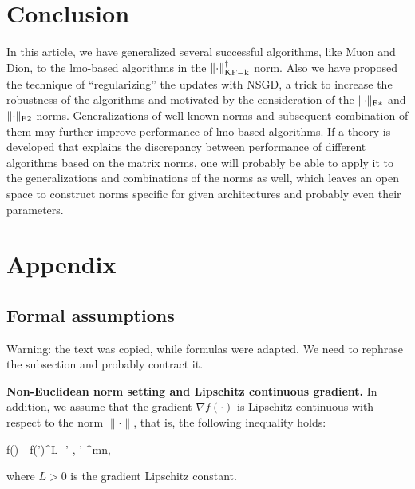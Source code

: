 \documentclass{article} %
\newcommand{\norm}[1]{\lVert #1\rVert}
\newcommand{\Rmn}{\R^{m\times n}}
\DeclarePairedDelimiter{\normkfk}{\|}{\|_\mathrm{KF-k}}
\DeclarePairedDelimiter{\normfstar}{\|}{\|_\mathrm{F*}}
\DeclarePairedDelimiter{\normftwo}{\|}{\|_\mathrm{F2}}
\newcounter{aequation}
\begin{document}
\section{Conclusion}
In this article, we have generalized several successful algorithms, like Muon and Dion, to the lmo-based algorithms in the $\normkfk{\cdot}^\dagger$ norm. Also we have proposed the technique of ``regularizing'' the updates with NSGD, a trick to increase the robustness of the algorithms and motivated by the consideration of the $\normfstar{\cdot}$ and $\normftwo{\cdot}$ norms. Generalizations of well-known norms and subsequent combination of them may further improve performance of lmo-based algorithms. If a theory is developed that explains the discrepancy between performance of different algorithms based on the matrix norms, one will probably be able to apply it to the generalizations and combinations of the norms as well, which leaves an open space to construct norms specific for given architectures and probably even their parameters.




\section{Appendix}
\subsection{Formal assumptions}
Warning: the text was copied, while formulas were adapted. We need to rephrase the subsection and probably contract it.


{\bf Non-Euclidean norm setting and Lipschitz continuous gradient.}
    In addition, we assume that the gradient $\nabla f(\cdot)$ is Lipschitz continuous with respect to the norm $\norm{\cdot}$, that is, the following inequality holds:
    \begin{aequation}\label{eq:L}
    \norm{\nabla f(\mX) - \nabla f(\mX')}^\dagger \leq L \norm{\mX-\mX'}
    \quad{}\;
    \mX, \mX' \in \Rmn,
    \end{aequation}
    where $L > 0$ is the gradient Lipschitz constant.
\end{document}
